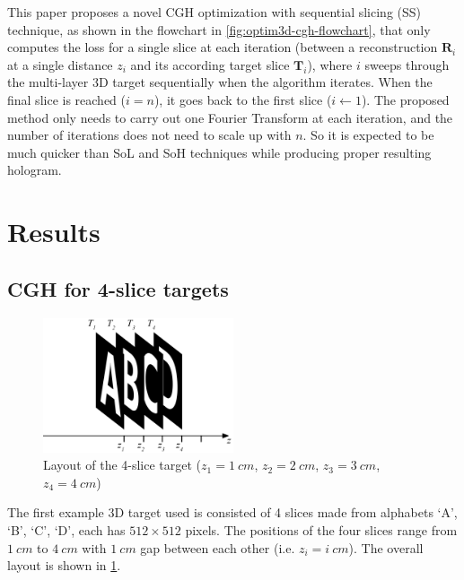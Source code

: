 This paper proposes a novel CGH optimization with sequential slicing (SS) technique, as shown in the flowchart in \cref{fig:optim3d-cgh-flowchart}, that only computes the loss for a single slice at each iteration (between a reconstruction $\textbf{R}_i$ at a single distance $z_i$ and its according target slice $\textbf{T}_i$), where $i$ sweeps through the multi-layer 3D target sequentially when the algorithm iterates. When the final slice is reached ($i=n$), it goes back to the first slice ($i \gets 1$). The proposed method only needs to carry out one Fourier Transform at each iteration, and the number of iterations does not need to scale up with $n$. So it is expected to be much quicker than SoL and SoH techniques while producing proper resulting hologram.










\section{Results}
\subsection{CGH for 4-slice targets}

\begin{figure}[h!]
	\centering
	\includegraphics[width=0.5\textwidth]{Fresnel_slice_ABCD}
	\caption{Layout of the 4-slice target ($z_1=1\ cm$, $z_2=2\ cm$, $z_3=3\ cm$, $z_4=4\ cm$)}
	\label{fig:Fresnel_slice_ABCD}
\end{figure}

The first example 3D target used is consisted of 4 slices made from alphabets `A', `B', `C', `D', each has $512\times512$ pixels. The positions of the four slices range from $1\ cm$ to $4\ cm$ with $1\ cm$ gap between each other (i.e. $z_i=i\ cm$). The overall layout is shown in \cref{fig:Fresnel_slice_ABCD}.

